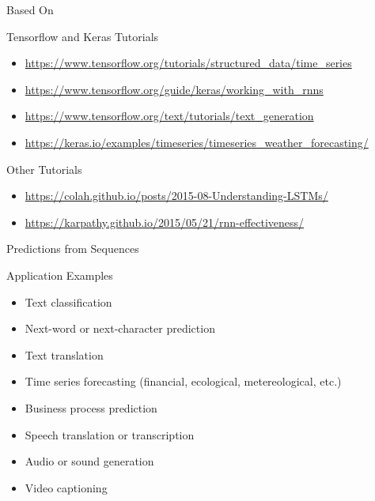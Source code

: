 \documentclass[ignorenonframetext,xcolor=x11names]{beamer}
\begin{document}
\begin{frame}{Based On}
\begin{block}{Tensorflow and Keras Tutorials}
\begin{itemize}
\item \url{https://www.tensorflow.org/tutorials/structured_data/time_series} \\
\item \url{https://www.tensorflow.org/guide/keras/working_with_rnns} \\
\item \url{https://www.tensorflow.org/text/tutorials/text_generation} \\
\item \url{https://keras.io/examples/timeseries/timeseries_weather_forecasting/} \\
\end{itemize}
\end{block}

\begin{block}{Other Tutorials}
\begin{itemize}
\item \url{https://colah.github.io/posts/2015-08-Understanding-LSTMs/}
\item \url{https://karpathy.github.io/2015/05/21/rnn-effectiveness/}
\end{itemize}
\end{block}
\end{frame}

\begin{frame}{Predictions from Sequences}
\begin{block}{Application Examples}
\begin{itemize}
   \item Text classification
   \item Next-word or next-character prediction
   \item Text translation
   \item Time series forecasting (financial, ecological, metereological, etc.)
   \item Business process prediction
   \item Speech translation or transcription
   \item Audio or sound generation
   \item Video captioning
\end{itemize}
\end{block}
\end{frame}
\end{document}
